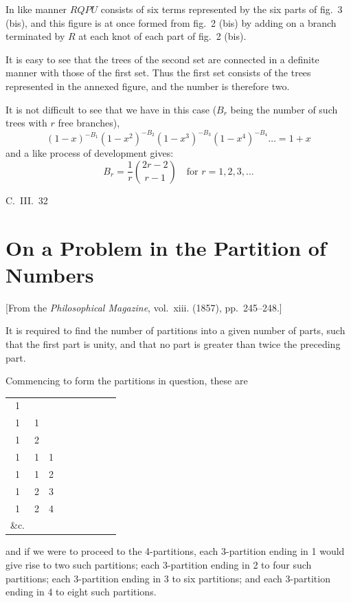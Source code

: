 \documentclass[11pt,a4paper]{book}
\begin{document}
In like manner $RQPU$ consists of six terms represented by the six parts of fig.~3 (bis), and this figure is at once formed from fig.~2 (bis) by adding on a branch terminated by $R$ at each knot of each part of fig.~2 (bis).

It is easy to see that the trees of the second set are connected in a definite manner with those of the first set. Thus the first set consists of the trees represented in the annexed figure, and the number is therefore two.

It is not difficult to see that we have in this case ($B_r$ being the number of such trees with $r$ free branches),
\[
(1-x)^{-B_1}(1-x^2)^{-B_2}(1-x^3)^{-B_3}(1-x^4)^{-B_4}\ldots = 1 + x
\]
and a like process of development gives:
\[
B_r = \frac{1}{r}\binom{2r-2}{r-1} \quad \text{for } r = 1, 2, 3, \ldots
\]

\hfill C.~III.~32
\newpage


\section{On a Problem in the Partition of Numbers}
\label{sec:204}

[From the \textit{Philosophical Magazine}, vol.~xiii. (1857), pp.~245--248.]
\vspace{1em}

It is required to find the number of partitions into a given number of parts, such that the first part is unity, and that no part is greater than twice the preceding part.

Commencing to form the partitions in question, these are
\begin{center}
\begin{tabular}{ccccccccc}
1 & & & & & & & & \\
1 & 1 & & & & & & & \\
1 & 2 & & & & & & & \\
1 & 1 & 1 & & & & & & \\
1 & 1 & 2 & & & & & & \\
1 & 2 & 3 & & & & & & \\
1 & 2 & 4 & & & & & & \\
\&c. & & & & & & & 
\end{tabular}
\end{center}
and if we were to proceed to the 4-partitions, each 3-partition ending in 1 would give rise to two such partitions; each 3-partition ending in 2 to four such partitions; each 3-partition ending in 3 to six partitions; and each 3-partition ending in 4 to eight such partitions.
\end{document}
